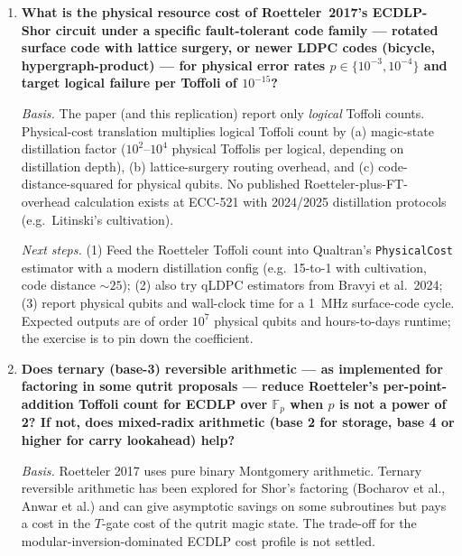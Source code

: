 \begin{enumerate}
\emph{Next steps.} (1) Implement each candidate algorithm's controlled
point-addition in the same framework (Qualtran) with the same window-size
parameterization; (2) tabulate Toffoli count and qubit count at $n \in \{256,
384, 521\}$; (3) also count non-Clifford AND-computations separately;
(4) publish a side-by-side table with matched assumptions. Estimated effort:
2--3 person-weeks per algorithm.

\item \textbf{What is the physical resource cost of Roetteler~2017's ECDLP-Shor circuit under a specific fault-tolerant code family --- rotated surface code with lattice surgery, or newer LDPC codes (bicycle, hypergraph-product) --- for physical error rates $p \in \{10^{-3}, 10^{-4}\}$ and target logical failure per Toffoli of $10^{-15}$?}

\emph{Basis.} The paper (and this replication) report only \emph{logical}
Toffoli counts. Physical-cost translation multiplies logical Toffoli count by
(a) magic-state distillation factor ($10^2$--$10^4$ physical Toffolis per
logical, depending on distillation depth), (b) lattice-surgery routing
overhead, and (c) code-distance-squared for physical qubits. No published
Roetteler-plus-FT-overhead calculation exists at ECC-521 with 2024/2025
distillation protocols (e.g.\ Litinski's cultivation).

\emph{Next steps.} (1) Feed the Roetteler Toffoli count into Qualtran's
\texttt{PhysicalCost} estimator with a modern distillation config
(e.g.\ 15-to-1 with cultivation, code distance $\sim 25$); (2) also try qLDPC
estimators from Bravyi et al.\ 2024; (3) report physical qubits and wall-clock
time for a 1~MHz surface-code cycle. Expected outputs are of order $10^7$
physical qubits and hours-to-days runtime; the exercise is to pin down the
coefficient.

\item \textbf{Does ternary (base-3) reversible arithmetic --- as implemented for factoring in some qutrit proposals --- reduce Roetteler's per-point-addition Toffoli count for ECDLP over $\mathbb{F}_p$ when $p$ is not a power of 2? If not, does mixed-radix arithmetic (base 2 for storage, base 4 or higher for carry lookahead) help?}

\emph{Basis.} Roetteler 2017 uses pure binary Montgomery arithmetic. Ternary
reversible arithmetic has been explored for Shor's factoring (Bocharov et al.,
Anwar et al.) and can give asymptotic savings on some subroutines but pays a
cost in the $T$-gate cost of the qutrit magic state. The trade-off for the
modular-inversion-dominated ECDLP cost profile is not settled.


\end{enumerate}
